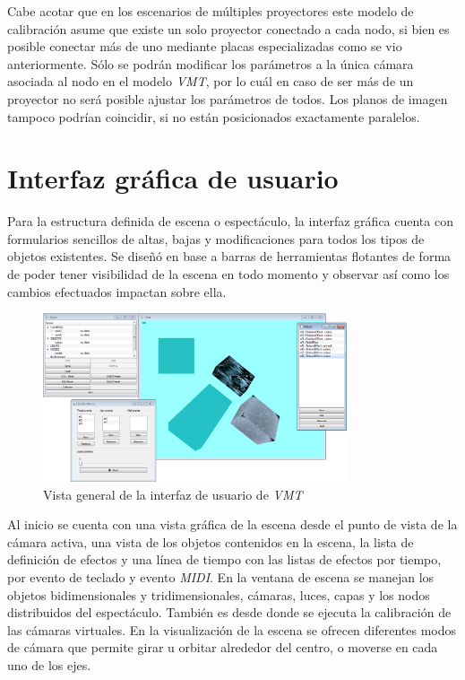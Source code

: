 Cabe acotar que en los escenarios de múltiples proyectores este modelo de calibración asume que existe un solo proyector conectado a cada nodo, si bien es posible conectar más de uno mediante placas especializadas como se vio anteriormente. Sólo se podrán modificar los parámetros a la única cámara asociada al nodo en el modelo \emph{VMT}, por lo cuál en caso de ser más de un proyector no será posible ajustar los parámetros de todos. Los planos de imagen tampoco podrían coincidir, si no están posicionados exactamente paralelos.


\section{Interfaz gráfica de usuario}

Para la estructura definida de escena o espectáculo, la interfaz gráfica cuenta con formularios sencillos de altas, bajas y modificaciones para todos los tipos de objetos existentes. Se diseñó en base a barras de herramientas flotantes de forma de poder tener visibilidad de la escena en todo momento y observar así como los cambios efectuados impactan sobre ella.

\begin{figure}[H]
  \centering
    \includegraphics[width=0.8\textwidth]{./Cap5_vmt/vmt_todo.png}
  \caption{Vista general de la interfaz de usuario de \emph{VMT}}
  \label{fig:VMT-MainWindow}
\end{figure}

Al inicio se cuenta con una vista gráfica de la escena desde el punto de vista de la cámara activa, una vista de los objetos contenidos en la escena, la lista de definición de efectos y una línea de tiempo con las listas de efectos por tiempo, por evento de teclado y evento \emph{MIDI}.
En la ventana de escena se manejan los objetos bidimensionales y tridimensionales, cámaras, luces, capas y los nodos distribuidos del espectáculo. También es desde donde se ejecuta la calibración de las cámaras virtuales. En la visualización de la escena se ofrecen diferentes modos de cámara que permite girar u orbitar alrededor del centro, o moverse en cada uno de los ejes.

